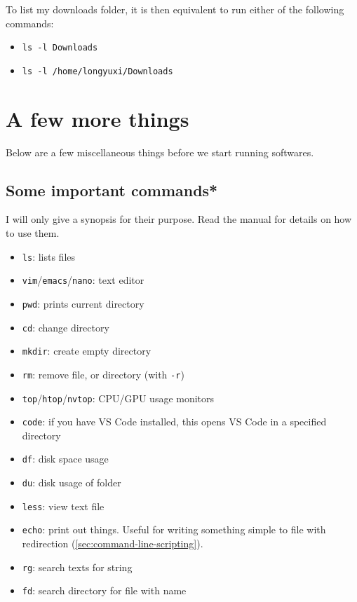 \documentclass[12pt,letterpaper]{article}
\begin{document}
To list my downloads folder, it is then equivalent to run either of the following commands:

\begin{itemize}
   \item \texttt{ls -l Downloads}
   \item \texttt{ls -l /home/longyuxi/Downloads}
\end{itemize}

\section{A few more things}

Below are a few miscellaneous things before we start running softwares.

\subsection{Some important commands*}

I will only give a synopsis for their purpose. Read the manual for details on how to use them.

\begin{itemize}
   \item \texttt{ls}: lists files
   \item \texttt{vim}/\texttt{emacs}/\texttt{nano}: text editor
   \item \texttt{pwd}: prints current directory
   \item \texttt{cd}: change directory
   \item \texttt{mkdir}: create empty directory
   \item \texttt{rm}: remove file, or directory (with \texttt{-r})
   \item \texttt{top}/\texttt{htop}/\texttt{nvtop}: CPU/GPU usage monitors
   \item \texttt{code}: if you have VS Code installed, this opens VS Code in a specified directory
   \item \texttt{df}: disk space usage
   \item \texttt{du}: disk usage of folder
   \item \texttt{less}: view text file
   \item \texttt{echo}: print out things. Useful for writing something simple to file with redirection (\cref*{sec:command-line-scripting}).
   \item \texttt{rg}: search texts for string
   \item \texttt{fd}: search directory for file with name
\end{itemize}
\end{document}
